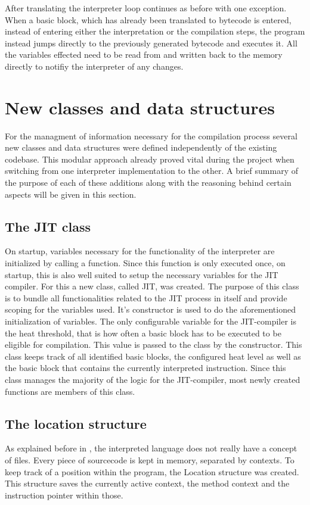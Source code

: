 After translating the interpreter loop continues as before with one exception. When a basic block, which has already been translated to bytecode is entered, instead of entering either the interpretation or the compilation steps, the program instead jumps directly to the previously generated bytecode and executes it. All the variables effected need to be read from and written back to the memory directly to notifiy the interpreter of any changes.

\section{New classes and data structures}
For the managment of information necessary for the compilation process several new classes and data structures were defined independently of the existing codebase. This modular approach already proved vital during the project when switching from one interpreter implementation to the other. A brief summary of the purpose of each of these additions along with the reasoning behind certain aspects will be given in this section.

\subsection{The JIT class}
On startup, variables necessary for the functionality of the interpreter are initialized by calling a function. Since this function is only executed once, on startup, this is also well suited to setup the necessary variables for the JIT compiler. 
For this a new class, called JIT, was created. The purpose of this class is to bundle all functionalities related to the JIT process in itself and provide scoping for the variables used. It's constructor is used to do the aforementioned initialization of variables. The only configurable variable for the JIT-compiler is the heat threshold, that is how often a basic block has to be executed to be eligible for compilation. This value is passed to the class by the constructor.
This class keeps track of all identified basic blocks, the configured heat level as well as the basic block that contains the currently interpreted instruction.
Since this class manages the majority of the logic for the JIT-compiler, most newly created functions are members of this class. 

\subsection{The location structure}
As explained before in , the interpreted language does not really have a concept of files. Every piece of sourcecode is kept in memory, separated by contexts. 
To keep track of a position within the program, the Location structure was created. This structure saves the currently active context, the method context and the instruction pointer within those.

